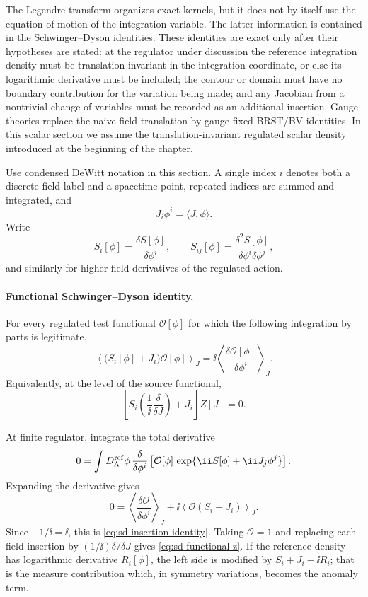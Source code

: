 The Legendre transform organizes exact kernels, but it does not by itself use
the equation of motion of the integration variable.  The latter information is
contained in the Schwinger--Dyson identities.  These identities are exact only
after their hypotheses are stated: at the regulator under discussion the
reference integration density must be translation invariant in the integration
coordinate, or else its logarithmic derivative must be included; the contour or
domain must have no boundary contribution for the variation being made; and
any Jacobian from a nontrivial change of variables must be recorded as an
additional insertion.  Gauge theories replace the naive field translation by
gauge-fixed BRST/BV identities.  In this scalar section we assume the
translation-invariant regulated scalar density introduced at the beginning of
the chapter.

Use condensed DeWitt notation in this section.  A single index \(i\) denotes
both a discrete field label and a spacetime point, repeated indices are summed
and integrated, and
\[
  J_i\phi^i=\langle J,\phi\rangle .
\]
Write
\[
  S_i[\phi]=\frac{\delta S[\phi]}{\delta\phi^i},
  \qquad
  S_{ij}[\phi]=\frac{\delta^2S[\phi]}
    {\delta\phi^i\delta\phi^j},
\]
and similarly for higher field derivatives of the regulated action.

\paragraph{Functional Schwinger--Dyson identity.}
For every regulated test functional \(\mathcal O[\phi]\) for which the
following integration by parts is legitimate,
\begin{equation}
  \left\langle
    \bigl(S_i[\phi]+J_i\bigr)\mathcal O[\phi]
  \right\rangle_J
  =
  \ii\left\langle
    \frac{\delta\mathcal O[\phi]}{\delta\phi^i}
  \right\rangle_J .
  \label{eq:sd-insertion-identity}
\end{equation}
Equivalently, at the level of the source functional,
\begin{equation}
  \left[
    S_i\!\left(\frac1{\ii}\frac{\delta}{\delta J}\right)
    +J_i
  \right]Z[J]=0 .
  \label{eq:sd-functional-z}
\end{equation}

At finite regulator, integrate the total derivative
\[
  0=
  \int D_\Lambda^{\rm ref}\phi\,
  \frac{\delta}{\delta\phi^i}
  \left[
    \mathcal O[\phi]\,
    \exp\{\ii S[\phi]+\ii J_j\phi^j\}
  \right].
\]
Expanding the derivative gives
\[
  0=
  \left\langle
    \frac{\delta\mathcal O}{\delta\phi^i}
  \right\rangle_J
  +
  \ii
  \left\langle
    \mathcal O(S_i+J_i)
  \right\rangle_J .
\]
Since \(-1/\ii=\ii\), this is
\eqref{eq:sd-insertion-identity}.  Taking \(\mathcal O=1\) and replacing each
field insertion by \((1/\ii)\delta/\delta J\) gives
\eqref{eq:sd-functional-z}.  If the reference density has logarithmic
derivative \(R_i[\phi]\), the left side is modified by
\(S_i+J_i-\ii R_i\); that is the measure contribution which, in symmetry
variations, becomes the anomaly term.

